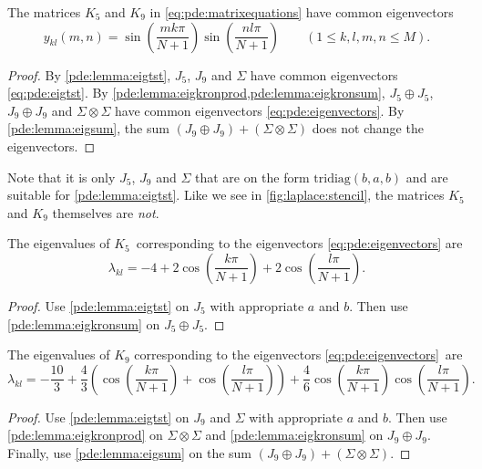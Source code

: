 \newcommand{\eigvecexpr}{\sin \left( \frac{mk\pi}{N+1} \right) \sin \left( \frac{nl\pi}{N+1} \right)}
\begin{theorem}
	The matrices $K_5$ and $K_9$ in \cref{eq:pde:matrixequations} have common eigenvectors
	\begin{equation}
		y_{kl}(m,n)= \eigvecexpr \qquad (1 \leq k,l,m,n \leq M).
		\label{eq:pde:eigenvectors}
	\end{equation}
\end{theorem}
\begin{proof}
	By \cref{pde:lemma:eigtst}, $J_5$, $J_9$ and $\Sigma$ have common eigenvectors \ref{eq:pde:eigtst}.
	By \cref{pde:lemma:eigkronprod,pde:lemma:eigkronsum}, $J_5 \oplus J_5$, $J_9 \oplus J_9$ and $\Sigma \otimes \Sigma$ have common eigenvectors \ref{eq:pde:eigenvectors}.
	By \cref{pde:lemma:eigsum}, the sum $(J_9 \oplus J_9) + (\Sigma \otimes \Sigma)$ does not change the eigenvectors.
\end{proof}
Note that it is only $J_5$, $J_9$ and $\Sigma$ that are on the form $\text{tridiag}(b,a,b)$ and are suitable for \cref{pde:lemma:eigtst}.
Like we see in \cref{fig:laplace:stencil}, the matrices $K_5$ and $K_9$ themselves are \emph{not}.
\begin{theorem}
The eigenvalues of $K_5$ corresponding to the eigenvectors \ref{eq:pde:eigenvectors} are
\begin{equation}
	\lambda_{kl} = -4 + 2 \cos \left( \frac{k\pi}{N+1} \right) + 2 \cos \left( \frac{l\pi}{N+1} \right).
	\label{eq:pde:eigvals5}
\end{equation}
\end{theorem}
\begin{proof}
	Use \cref{pde:lemma:eigtst} on $J_5$ with appropriate $a$ and $b$.
	Then use \cref{pde:lemma:eigkronsum} on $J_5 \oplus J_5$.
\end{proof}
\begin{theorem}
The eigenvalues of $K_9$ corresponding to the eigenvectors \ref{eq:pde:eigenvectors} are
\begin{equation}
  \lambda_{kl} = -\frac{10}{3} + \frac43 \left( 
                   \cos\left(\frac{k \pi}{N+1}\right) + \cos\left(\frac{l \pi}{N+1}\right) 
               \right) + \frac46 \cos\left(\frac{k \pi}{N+1}\right) \cos\left(\frac{l \pi}{N+1}\right).
  \label{eq:pde:eigvals9}
\end{equation}
\end{theorem}
\begin{proof}
	Use \cref{pde:lemma:eigtst} on $J_9$ and $\Sigma$ with appropriate $a$ and $b$.
	Then use \cref{pde:lemma:eigkronprod} on $\Sigma \otimes \Sigma$ and \cref{pde:lemma:eigkronsum} on $J_9 \oplus J_9$.
	Finally, use \cref{pde:lemma:eigsum} on the sum $(J_9 \oplus J_9) + (\Sigma \otimes \Sigma)$.
\end{proof}

